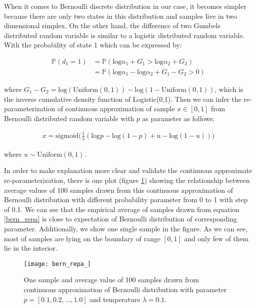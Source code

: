 When it comes to Bernoulli discrete distribution in our case, it becomes simpler because there are only two states in this distribution and samples live in two dimensional simplex. On the other hand, the difference of two Gumbels distributed random variable is similar to a logistic distributed random variable.  With the probability of state 1 which can be expressed by:

\[
\begin{aligned}
\mathbb P(d_1 = 1) &= \mathbb P(\text{log} \alpha_1 + G_1 >\text{log} \alpha_2 + G_2)\\
&=\mathbb P(\text{log} \alpha_1 - \text{log} \alpha_2 + G_1 - G_2 > 0)
\end{aligned}
\] 

where $G_1 - G_2 = \text{log}(\text{Uniform}(0,1)) - \text{log}(1-\text{Uniform}(0,1))$, which is the inverse cumulative density function of Logistic(0,1).
Then we can infer the re-parameterization of continuous approximation of sample $x \in [0, 1]$ from Bernoulli distributed random variable with $p$ as parameter as follows:

\begin{equation}\label{bern_repa}
\begin{aligned}
x = \text{sigmoid}\big(
\frac{1}{\lambda} (\text{log}p - \text{log}(1-p) + \text{u} - \text{log}(1-u)) 
\big)
\end{aligned}
\end{equation}

where $u \sim \text{Uniform}(0,1)$. 

In order to make explanation more clear and validate the continuous approximate re-parameterization, there is one plot (figure \ref{fig:bern_repa}) showing the relationship between average values of 100 samples drawn from this continuous approximation of Bernoulli distribution with different probability parameter from 0 to 1 with step of 0.1. We can see that the empirical average of samples drawn from equation \ref{bern_repa} is close to expectation of Bernoulli distribution of corresponding parameter. Additionally, we show one single sample in the figure. As we can see, most of samples are lying on the boundary of range $[0,1]$ and only few of them lie in the interior.
\begin{figure}[h!]
	\begin{center}
		\texttt{[image: bern\_repa\_]}
		\caption{One sample and average value of 100 samples drawn from continuous approximation of Bernoulli distribution with parameter $p = [0.1, 0.2, ..., 1.0]$ and temperature $ \lambda =0.1$.}		
		\label{fig:bern_repa}
	\end{center}
\end{figure}

